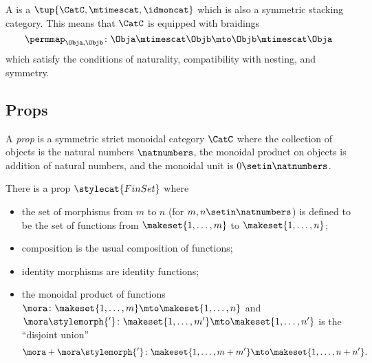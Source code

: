 
\begin{ctdefinition}
    \label{def:symmetric-strict-monoidal-cat}
    A  is a  $\tup{\CatC, \mtimescat, \idmoncat}$ which is also a symmetric stacking category.
    This means that $\CatC$ is equipped with braidings
    \begin{equation}
        \permmap_{\Obja, \Objb} \colon \Obja \mtimescat \Objb \mto \Objb \mtimescat \Obja \end{equation}
    which satisfy the conditions of naturality, compatibility with nesting, and symmetry.
\end{ctdefinition}

\subsection{Props}

\begin{ctdefinition}\label{def:prop}
    A \emph{prop} is a symmetric strict monoidal category $\CatC$ where the collection of objects is the natural numbers $\natnumbers$, the monoidal product on objects is addition of natural numbers, and the monoidal unit is $0 \setin \natnumbers$.
\end{ctdefinition}

\begin{example}\label{exa:prop-finset}
    There is a prop $\stylecat{FinSet}$ where
    \begin{itemize}
        \item the set of morphisms from $m$ to $n$ (for $m, n \setin \natnumbers$) is defined to be the set of functions from $\makeset{1, \dots, m}$ to $\makeset{1, \dots, n}$;
        \item composition is the usual composition of functions;
        \item identity morphisms are identity functions;
        \item the monoidal product of functions $\mora \colon \makeset{1, \dots, m} \mto \makeset{1, \dots, n}$ and $\mora\stylemorph{'} \colon \makeset{1, \dots, m'} \mto \makeset{1, \dots, n'}$ is the ``disjoint union''
              \begin{equation}
                  \mora + \mora\stylemorph{'} \colon \makeset{1, \dots, m + m'} \mto \makeset{1, \dots, n + n'}.
              \end{equation}
    \end{itemize}
\end{example}

